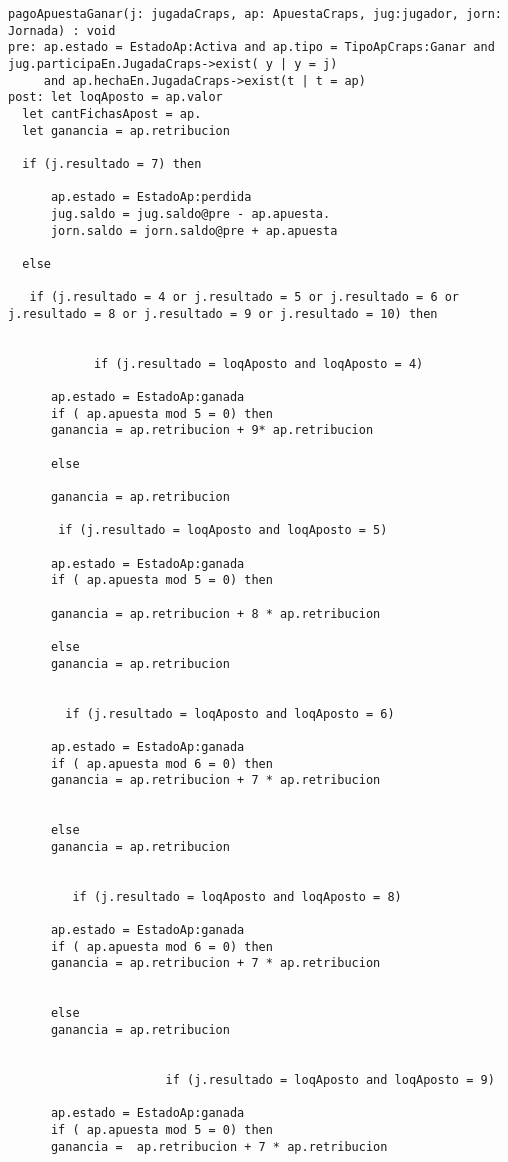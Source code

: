 \begin{framed}
\begin{lstlisting}[breaklines=true]
pagoApuestaGanar(j: jugadaCraps, ap: ApuestaCraps, jug:jugador, jorn: Jornada) : void
pre: ap.estado = EstadoAp:Activa and ap.tipo = TipoApCraps:Ganar and jug.participaEn.JugadaCraps->exist( y | y = j) 
     and ap.hechaEn.JugadaCraps->exist(t | t = ap)
post: let loqAposto = ap.valor
  let cantFichasApost = ap.
  let ganancia = ap.retribucion

  if (j.resultado = 7) then

      ap.estado = EstadoAp:perdida
      jug.saldo = jug.saldo@pre - ap.apuesta.
      jorn.saldo = jorn.saldo@pre + ap.apuesta

  else

   if (j.resultado = 4 or j.resultado = 5 or j.resultado = 6 or j.resultado = 8 or j.resultado = 9 or j.resultado = 10) then


            if (j.resultado = loqAposto and loqAposto = 4)

      ap.estado = EstadoAp:ganada
      if ( ap.apuesta mod 5 = 0) then
      ganancia = ap.retribucion + 9* ap.retribucion
      
      else
      
      ganancia = ap.retribucion 
      
       if (j.resultado = loqAposto and loqAposto = 5)

      ap.estado = EstadoAp:ganada
      if ( ap.apuesta mod 5 = 0) then
      
      ganancia = ap.retribucion + 8 * ap.retribucion
      
      else
      ganancia = ap.retribucion 
        

        if (j.resultado = loqAposto and loqAposto = 6)

      ap.estado = EstadoAp:ganada
      if ( ap.apuesta mod 6 = 0) then
      ganancia = ap.retribucion + 7 * ap.retribucion
      
      
      else
      ganancia = ap.retribucion 
      

         if (j.resultado = loqAposto and loqAposto = 8)

      ap.estado = EstadoAp:ganada
      if ( ap.apuesta mod 6 = 0) then
      ganancia = ap.retribucion + 7 * ap.retribucion
      

      else
      ganancia = ap.retribucion 
      

                      if (j.resultado = loqAposto and loqAposto = 9)

      ap.estado = EstadoAp:ganada
      if ( ap.apuesta mod 5 = 0) then
      ganancia =  ap.retribucion + 7 * ap.retribucion
      


\end{lstlisting}
\end{framed}
